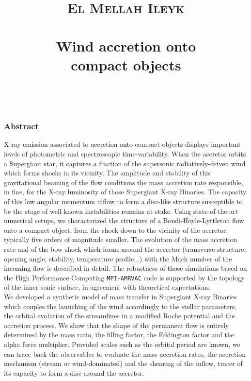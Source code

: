 \documentclass[paper=a4, fontsize=12pt,twoside]{scrartcl}
\title{	
\vspace*{-1.5cm}
\normalfont \normalsize 
\textsc{El Mellah Ileyk} \\ [25pt] %
\horrule{0.5pt} \\[0.4cm] %
\huge Wind accretion onto\\ compact objects \\ %
\horrule{2pt} \\[0.5cm] %
}
\date{} %
\begin{document}
\maketitle
\thispagestyle{empty}

\vspace*{-3cm}
\subsubsection*{Abstract}

X-ray emission associated to accretion onto compact objects displays important levels of photometric
and spectroscopic time-variability. When the accretor orbits a Supergiant star, it captures a fraction of
the supersonic radiatively-driven wind which forms shocks in its vicinity. The amplitude and stability of
this gravitational beaming of the flow conditions the mass accretion rate responsible, in fine, for the X-ray
luminosity of those Supergiant X-ray Binaries. The capacity of this low angular momentum inflow to form
a disc-like structure susceptible to be the stage of well-known instabilities remains at stake.
Using state-of-the-art numerical setups, we characterized the structure of a Bondi-Hoyle-Lyttleton
flow onto a compact object, from the shock down to the vicinity of the accretor, typically five orders of
magnitude smaller. The evolution of the mass accretion rate and of the bow shock which forms around
the accretor (transverse structure, opening angle, stability, temperature profile...) with the Mach number
of the incoming flow is described in detail. The robustness of those simulations based on the High
Performance Computing \texttt{MPI-AMRVAC} code is supported by the topology of the inner sonic surface, in
agreement with theoretical expectations.\\

We developed a synthetic model of mass transfer in Supergiant X-ray Binaries which couples the launching
of the wind accordingly to the stellar parameters, the orbital evolution of the streamlines in a modified
Roche potential and the accretion process. We show that the shape of the permanent flow is entirely determined
by the mass ratio, the filling factor, the Eddington factor and the alpha force multiplier. Provided
scales such as the orbital period are known, we can trace back the observables to evaluate the mass accretion
rates, the accretion mechanism (stream or wind-dominated) and the shearing of the inflow, tracer of
its capacity to form a disc around the accretor.\\
\end{document}
